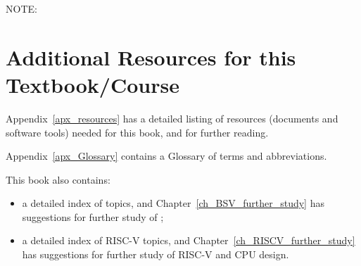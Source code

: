 \vspace{1ex}

NOTE: 

\vspace{1ex}



\section{Additional Resources for this Textbook/Course}

Appendix~\ref{apx_resources} has a detailed listing of resources
(documents and software tools) needed for this book, and for further
reading.

Appendix~\ref{apx_Glossary} contains a Glossary of terms and
abbreviations.

This book also contains:

\begin{itemize}

 \item a detailed index of {\BSV} topics, and
       Chapter~\ref{ch_BSV_further_study} has suggestions for further
       study of {\BSV};

 \item a detailed index of RISC-V topics, and
       Chapter~\ref{ch_RISCV_further_study} has suggestions for
       further study of RISC-V and CPU design.

 \end{itemize}

